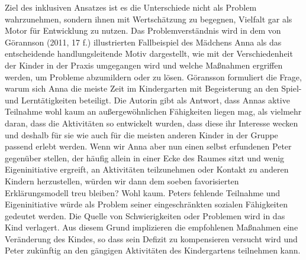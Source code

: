 Ziel des inklusiven Ansatzes ist es die Unterschiede nicht als Problem wahrzunehmen, sondern ihnen mit Wertschätzung zu begegnen, Vielfalt gar als Motor für Entwicklung zu nutzen. Das Problemverständnis wird in dem von Görannson (2011, 17 f.) illustrierten Fallbeispiel des Mädchens Anna als das entscheidende handlungsleitende Motiv dargestellt, wie mit der Verschiedenheit der Kinder in der Praxis umgegangen wird und welche Maßnahmen ergriffen werden, um Probleme abzumildern oder zu lösen. Göransson formuliert die Frage, warum sich Anna die meiste Zeit im Kindergarten mit Begeisterung an den Spiel- und Lerntätigkeiten beteiligt. Die Autorin gibt als Antwort, dass Annas aktive Teilnahme wohl kaum an außergewöhnlichen Fähigkeiten liegen mag, als vielmehr daran, dass die Aktivitäten so entwickelt wurden, dass diese ihr Interesse wecken und deshalb für sie wie auch für die meisten anderen Kinder in der Gruppe passend erlebt werden. Wenn wir Anna aber nun einen selbst erfundenen Peter gegenüber stellen, der häufig allein in einer Ecke des Raumes sitzt und wenig Eigeninitiative ergreift, an Aktivitäten teilzunehmen oder Kontakt zu anderen Kindern herzustellen, würden wir dann dem soeben favorisierten Erklärungsmodell treu bleiben? Wohl kaum. Peters fehlende Teilnahme und Eigeninitiative würde als Problem seiner eingeschränkten sozialen Fähigkeiten gedeutet werden.  Die Quelle von Schwierigkeiten oder Problemen wird in das Kind verlagert. Aus diesem Grund implizieren die empfohlenen Maßnahmen eine Veränderung des Kindes, so dass sein Defizit zu kompensieren versucht wird und Peter zukünftig an den gängigen Aktivitäten des Kindergartens teilnehmen kann. 

